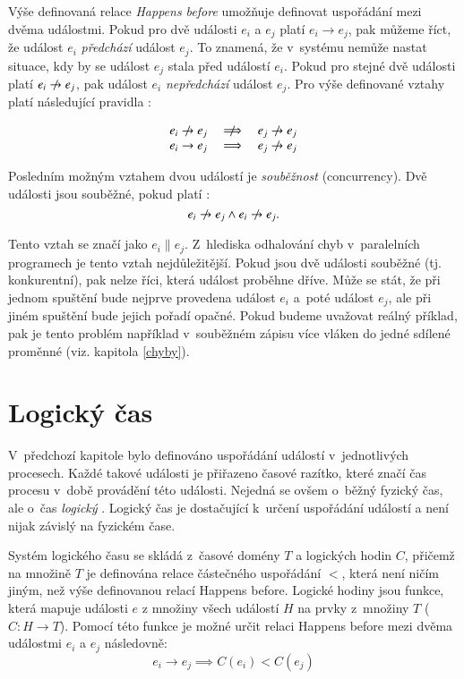 Výše definovaná relace \textit{Happens before} umožňuje definovat uspořádání mezi dvěma událostmi. Pokud pro dvě události $e_i$ a $e_j$ platí $e_i \rightarrow e_j$, pak můžeme říct, že událost $e_i$ \textit{předchází} událost $e_j$.
To znamená, že v~systému nemůže nastat situace, kdy by se událost $e_j$ stala před událostí $e_i$. Pokud pro stejné dvě události platí $e_i \centernot\rightarrow e_j$, pak událost $e_i$ \textit{nepředchází} událost $e_j$. Pro výše definované vztahy platí následující pravidla \cite{cite:PDI}:

$$
\begin{array}{lcr}
e_i \centernot\rightarrow e_j & \centernot\implies & e_j \centernot\rightarrow e_j \\
e_i \rightarrow e_j & \implies & e_j \centernot\rightarrow e_j
\end{array}
$$

Posledním možným vztahem dvou událostí je \textit{souběžnost} (concurrency). Dvě události jsou souběžné, pokud platí \cite{cite:PDI}:
$$e_i \centernot\rightarrow e_j \wedge e_i \centernot\rightarrow e_j.$$

Tento vztah se značí jako $e_i \parallel e_j$. Z~hlediska odhalování chyb v~paralelních programech je tento vztah nejdůležitější. Pokud jsou dvě události souběžné (tj. konkurentní), pak nelze říci, která událost proběhne dříve. Může se stát, že při jednom spuštění bude nejprve provedena událost $e_i$ a~poté událost $e_j$, ale při jiném spuštění bude jejich pořadí opačné. Pokud budeme uvažovat reálný příklad, pak je tento problém například v~souběžném zápisu více vláken do jedné sdílené proměnné (viz. kapitola \ref{chyby}). 

\section{Logický čas}\label{logic-time}

V~předchozí kapitole bylo definováno uspořádání událostí v~jednotlivých procesech. Každé takové události je přiřazeno časové razítko, které značí čas procesu v~době provádění této události. Nejedná se ovšem o~běžný fyzický čas, ale o~čas \textit{logický} \cite{cite:HB}. Logický čas je dostačující k~určení uspořádání událostí a není nijak závislý na fyzickém čase.

Systém logického času se skládá z~časové domény $T$ a logických hodin $C$, přičemž na množině $T$ je definována relace částečného uspořádání $<$, která není ničím jiným, než výše definovanou relací Happens before. Logické hodiny jsou funkce, která mapuje události $e$ z množiny všech událostí $H$ na prvky z~množiny $T$ ($C : H \rightarrow T$). Pomocí této funkce je možné určit relaci Happens before mezi dvěma událostmi $e_i$ a $e_j$ následovně:
$$e_i \rightarrow e_j \implies C(e_i) < C(e_j)$$

